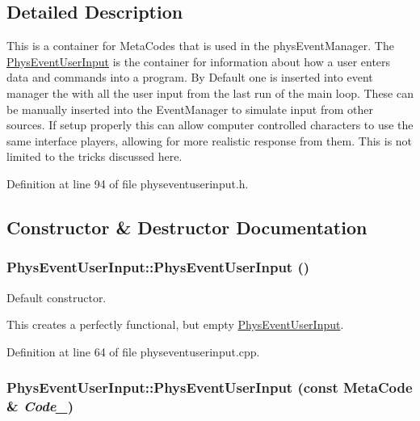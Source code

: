 \subsection{Detailed Description}
This is a container for MetaCodes that is used in the physEventManager. The \hyperlink{classPhysEventUserInput}{PhysEventUserInput} is the container for information about how a user enters data and commands into a program. By Default one is inserted into event manager the with all the user input from the last run of the main loop. These can be manually inserted into the EventManager to simulate input from other sources. If setup properly this can allow computer controlled characters to use the same interface players, allowing for more realistic response from them. This is not limited to the tricks discussed here. 

Definition at line 94 of file physeventuserinput.h.



\subsection{Constructor \& Destructor Documentation}
\hypertarget{classPhysEventUserInput_a6f8eaf698e8109d5cb30f2f17044f1ba}{
\subsubsection[{PhysEventUserInput}]{\setlength{\rightskip}{0pt plus 5cm}PhysEventUserInput::PhysEventUserInput ()}}
\label{dc/d0e/classPhysEventUserInput_a6f8eaf698e8109d5cb30f2f17044f1ba}


Default constructor. 

This creates a perfectly functional, but empty \hyperlink{classPhysEventUserInput}{PhysEventUserInput}. 

Definition at line 64 of file physeventuserinput.cpp.

\hypertarget{classPhysEventUserInput_ae13b1b02bfa3ef64dc4205478a68810f}{
\subsubsection[{PhysEventUserInput}]{\setlength{\rightskip}{0pt plus 5cm}PhysEventUserInput::PhysEventUserInput (const {\bf MetaCode} \& {\em Code\_\-})}}
\label{dc/d0e/classPhysEventUserInput_ae13b1b02bfa3ef64dc4205478a68810f}


